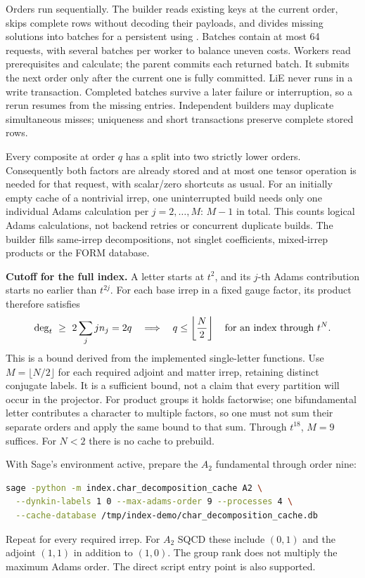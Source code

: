 Orders run sequentially. The builder reads existing keys at the current order,
skips complete rows without decoding their payloads, and divides missing
solutions into batches for a persistent  using
. Batches contain at most 64 requests, with several batches per
worker to balance uneven costs. Workers read prerequisites and calculate;
the parent commits each returned batch. It submits the next order only after
the current one is fully committed. LiE never runs in a write transaction.
Completed batches survive a later failure or interruption, so a rerun resumes
from the missing entries. Independent builders may duplicate simultaneous
misses; uniqueness and short transactions preserve complete stored rows.

Every composite at order $q$ has a split into two strictly lower orders.
Consequently both factors are already stored and at most one tensor operation
is needed for that request, with scalar/zero shortcuts as usual. For an initially
empty cache of a nontrivial irrep, one uninterrupted build needs only one
individual Adams calculation per $j=2,\ldots,M$: $M-1$ in total. This counts
logical Adams calculations, not backend retries or concurrent duplicate builds.
The builder fills same-irrep decompositions, not singlet coefficients, mixed-irrep
products or the FORM database.

\textbf{Cutoff for the full index.} A letter starts at $t^2$, and its $j$-th
Adams contribution starts no earlier than $t^{2j}$. For each base irrep in a
fixed gauge factor, its product therefore satisfies
\[
 \deg_t\ \geq\ 2\sum_j j n_j=2q
 \quad\Longrightarrow\quad
 q\leq\left\lfloor\frac{N}{2}\right\rfloor
 \quad\hbox{for an index through }t^N.
\]
This is a bound derived from the implemented single-letter functions. Use
$M=\lfloor N/2\rfloor$ for each required adjoint and matter irrep, retaining
distinct conjugate labels. It is a sufficient bound, not a claim that every
partition will occur in the projector. For product groups it holds factorwise;
one bifundamental letter contributes a character to multiple factors, so one
must not sum their separate orders and apply the same bound to that sum.
Through $t^{18}$, $M=9$ suffices. For $N<2$ there is no cache to prebuild.

\clearpage
{}
With Sage's environment active, prepare the $A_2$ fundamental through order nine:
\begin{lstlisting}[language=bash]
sage -python -m index.char_decomposition_cache A2 \
  --dynkin-labels 1 0 --max-adams-order 9 --processes 4 \
  --cache-database /tmp/index-demo/char_decomposition_cache.db
\end{lstlisting}
Repeat for every required irrep. For $A_2$ SQCD these include $(0,1)$ and the
adjoint $(1,1)$ in addition to $(1,0)$. The group rank does not multiply the
maximum Adams order. The direct script entry point
\code{sage -python index/char_decomposition_cache.py ...} is also supported.


